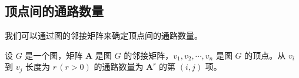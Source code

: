 \begin{collections}
\begin{solution}
\begin{center}
            \hspace{3em}
        \end{center}
    \end{solution}
\end{collections}

\subsection{顶点间的通路数量}
我们可以通过图的邻接矩阵来确定顶点间的通路数量。
\begin{theorem}
    设 $G$ 是一个图，矩阵 $\symbf{A}$ 是图 $G$ 的邻接矩阵，$v_1, v_2, \cdots, v_n$ 是图 $G$ 的顶点。从 $v_i$ 到 $v_j$ 长度为 $r\,(r > 0)$ 的通路数量为 $\symbf{A}^r$ 的第 $(i, j)$ 项。
\end{theorem}

